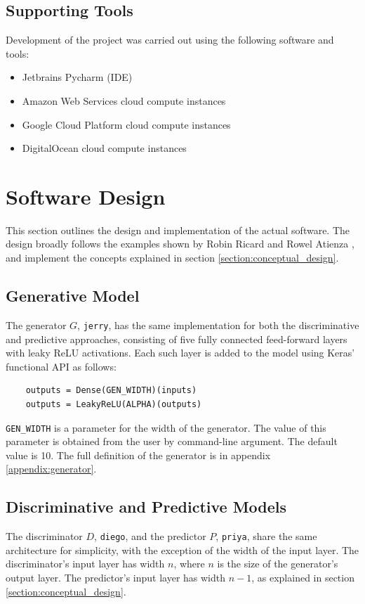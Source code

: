 \documentclass[12pt, titlepage]{report}
\theoremstyle{definition}
\begin{document}
\subsection{Supporting Tools}
Development of the project was carried out using the following software and tools:

\begin{itemize}
\item Jetbrains Pycharm (IDE)
\item Amazon Web Services cloud compute instances
\item Google Cloud Platform cloud compute instances
\item DigitalOcean cloud compute instances
\end{itemize}


\section{Software Design}
This section outlines the design and implementation of the actual software. The design broadly follows the examples shown by Robin Ricard \cite{ricard2017generative} and Rowel Atienza \cite{atienza2017gan}, and implement the concepts explained in section \ref{section:conceptual_design}.



\subsection{Generative Model}
The generator $G$, \texttt{jerry}, has the same implementation for both the discriminative and predictive approaches, consisting of five fully connected feed-forward layers with leaky ReLU activations. Each such layer is added to the model using Keras' functional API as follows:

\begin{verbatim}
    outputs = Dense(GEN_WIDTH)(inputs)
    outputs = LeakyReLU(ALPHA)(outputs)
\end{verbatim} 

\texttt{GEN_WIDTH} is a parameter for the width of the generator. The value of this parameter is obtained from the user by command-line argument. The default value is 10. The full definition of the generator is in appendix \ref{appendix:generator}.


\subsection{Discriminative and Predictive Models}
The discriminator $D$, \texttt{diego}, and the predictor $P$, \texttt{priya}, share the same architecture for simplicity, with the exception of the width of the input layer. The discriminator's input layer has width $n$, where $n$ is the size of the generator's output layer. The predictor's input layer has width $n - 1$, as explained in section \ref{section:conceptual_design}.
\end{document}

